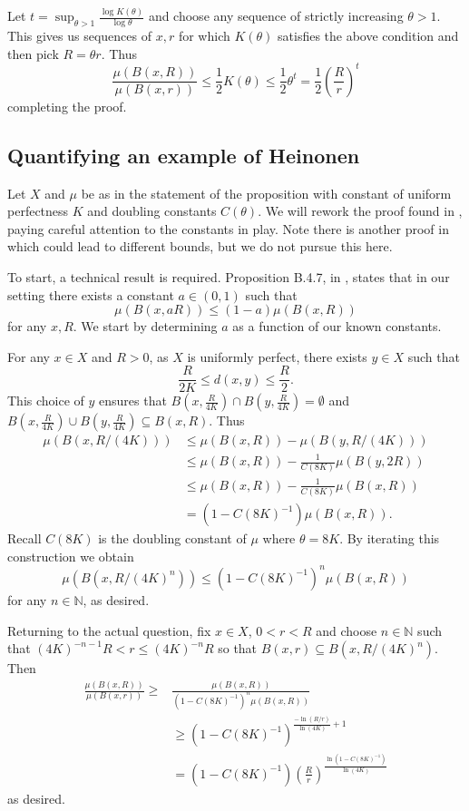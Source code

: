 Let $t = \sup_{\theta > 1} \frac{\log K(\theta)}{\log \theta}$ and choose any sequence of strictly increasing $\theta > 1$. This gives us sequences of $x,r$ for which $K(\theta)$ satisfies the above condition and then pick $R = \theta r$. Thus
\[
\frac{\mu(B(x,R))}{\mu(B(x,r))} \le \frac{1}{2} K(\theta) \le \frac{1}{2} \theta^t = \frac{1}{2} \left(\frac{R}{r} \right)^t
\]
completing the proof.



\subsection{Quantifying an example of Heinonen}\label{ch-quantifying:sec:proof-heinonen}



Let $X$ and $\mu$ be as in the statement of the proposition with constant of uniform perfectness $K$ and doubling constants $C(\theta)$. We will rework the proof found in \cite[lemma 3.1]{anti1}, paying careful attention to the constants in play. Note there is another proof in \cite[Lemma 4.5]{eino-pablo} which could lead to different bounds, but we do not pursue this here.
	
To start, a technical result is required. Proposition B.4.7, in \cite{gromov}, states that in our setting there exists a constant $a \in (0,1)$ such that 
\[
\mu(B(x,aR)) \le (1-a) \mu(B(x,R))
\]
for any $x,R$. We start by determining $a$ as a function of our known constants. 
	
For any $x\in X$ and $R>0$, as $X$ is uniformly perfect, there exists $y \in X$ such that $$\frac{R}{2K} \le d(x,y) \le \frac{R}{2}.$$ This choice of $y$ ensures that $B(x,\frac{R}{4K}) \cap B(y,\frac{R}{4K}) = \emptyset $ and $B(x,\frac{R}{4K}) \cup B(y,\frac{R}{4K}) \subseteq B(x,R)$. Thus
\begin{align*}
\mu(B(x,R/(4K))) &\le \mu(B(x,R)) - \mu(B(y, R/(4K)))\\
& \le \mu(B(x,R)) - \frac{1}{C(8K)}\mu(B(y,2R)) \\
& \le \mu(B(x,R)) - \frac{1}{C(8K)}\mu(B(x,R)) \\
& = (1-C(8K)^{-1}) \mu(B(x,R)).
\end{align*}
Recall $C(8K)$ is the doubling constant of $\mu$ where $\theta = 8K$. By iterating this construction we obtain
\[
\mu(B(x,R/(4K)^n)) \le (1-C(8K)^{-1})^n \mu(B(x,R))
\]
for any $n\in \mathbb{N}$, as desired.
	
Returning to the actual question, fix $x\in X$, $0 < r < R$ and choose $n\in \mathbb{N}$ such that $(4K)^{-n-1}R < r \le (4K)^{-n}R$ so that $B(x,r) \subseteq B(x,R/(4K)^{n})$. Then
\begin{align*}
\frac{\mu(B(x,R))}{\mu(B(x,r))} \ge& \frac{\mu(B(x,R))}{(1-C(8K)^{-1})^n\mu(B(x,R))} \\
& \ge (1-C(8K)^{-1})^{\frac{-\ln(R/r)}{\ln(4K)} + 1}\\
& = (1-C(8K)^{-1})\left(\frac{R}{r}\right)^{\frac{\ln(1-C(8K)^{-1})}{\ln(4K)}}
\end{align*}
as desired.
	
